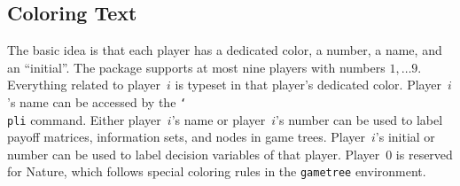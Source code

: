 \documentclass{article}
\renewcommand{\textbackslash}{\char`\\}
\def\cmd#1{\texttt{\color{cmd}\textbackslash#1}}
\begin{document}
\subsection{Coloring Text}

The basic idea is that each player has a dedicated color, a number, a name, and an ``initial''. The package supports at most nine players with numbers $1, \ldots 9$. Everything related to player~$i$ is typeset in that player's dedicated color. Player~$i$'s name can be accessed by the \cmd{pli} command. Either player~$i$'s name or player~$i$'s number can be used to label payoff matrices, information sets, and nodes in game trees. Player~$i$'s initial or number can be used to label decision variables of that player. Player~$0$ is reserved for Nature, which follows special coloring rules in the \texttt{gametree} environment.
\end{document}
